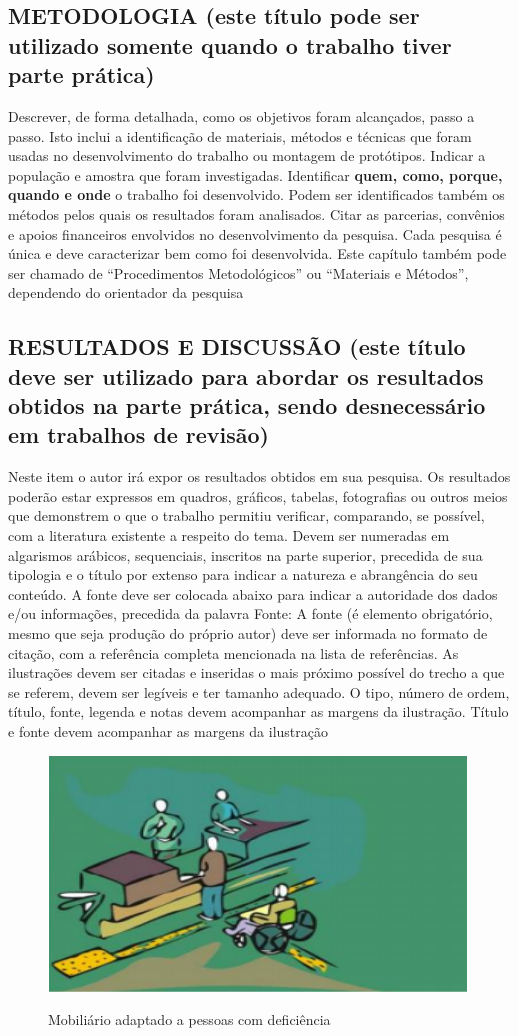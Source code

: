 \documentclass[12pt]{article}
\begin{document}
\subsection{METODOLOGIA (este título pode ser utilizado somente quando o trabalho tiver parte prática)}

Descrever, de forma detalhada, como os objetivos foram alcançados, passo a passo. Isto inclui a identificação de materiais, métodos e técnicas que foram usadas no desenvolvimento do trabalho ou montagem de protótipos. Indicar a população e amostra que foram investigadas. Identificar \textbf{quem, como, porque, quando e onde } o trabalho foi desenvolvido. Podem ser identificados também os métodos pelos quais os resultados foram analisados. Citar as parcerias, convênios e apoios financeiros envolvidos no desenvolvimento da pesquisa. Cada pesquisa é única e deve caracterizar bem como foi desenvolvida.
Este capítulo também pode ser chamado de “Procedimentos Metodológicos” ou “Materiais e Métodos”, dependendo do orientador da pesquisa


\subsection{RESULTADOS E DISCUSSÃO (este título deve ser utilizado para abordar os resultados obtidos na parte prática, sendo desnecessário em trabalhos de revisão)}


Neste item o autor irá expor os resultados obtidos em sua pesquisa. Os resultados poderão estar expressos em quadros, gráficos, tabelas, fotografias ou outros meios que demonstrem o que o trabalho permitiu verificar, comparando, se possível, com a literatura existente a respeito do tema. 
Devem ser numeradas em algarismos arábicos, sequenciais, inscritos na parte superior, precedida de sua tipologia e o título por extenso para indicar a natureza e abrangência do seu conteúdo. A fonte deve ser colocada abaixo para indicar a autoridade dos dados e/ou informações, precedida da palavra Fonte: A fonte (é elemento obrigatório, mesmo que seja produção do próprio autor) deve ser informada no formato de citação, com a referência completa mencionada na lista de referências.
As ilustrações devem ser citadas e inseridas o mais próximo possível do trecho a que se referem, devem ser legíveis e ter tamanho adequado. O tipo, número de ordem, título, fonte, legenda e notas devem acompanhar as margens da ilustração. Título e fonte devem acompanhar as margens da ilustração

\begin{figure}[H]
\centering
\caption{Mobiliário adaptado a pessoas com deficiência}
\includegraphics[width=.5\textwidth]{Fig/pupo.PNG}
{\footnotesize{}} %
\label{fig1}
\end{figure} 
\end{document}
